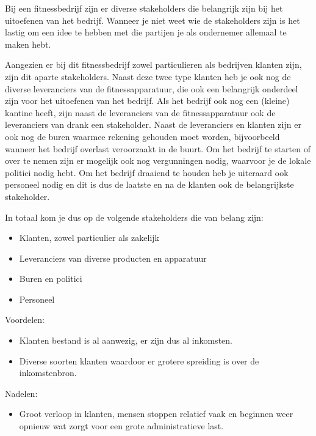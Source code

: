 Bij een fitnessbedrijf zijn er diverse stakeholders die belangrijk zijn bij het uitoefenen van het bedrijf. Wanneer je niet weet wie de stakeholders zijn is het lastig om een idee te hebben met die partijen je als ondernemer allemaal te maken hebt. 

Aangezien er bij dit fitnessbedrijf zowel particulieren als bedrijven klanten zijn, zijn dit aparte stakeholders. Naast deze twee type klanten heb je ook nog de diverse leveranciers van de fitnessapparatuur, die ook een belangrijk onderdeel zijn voor het uitoefenen van het bedrijf. Als het bedrijf ook nog een (kleine) kantine heeft, zijn naast de leveranciers van de fitnessapparatuur ook de leveranciers van drank een stakeholder.
Naast de leveranciers en klanten zijn er ook nog de buren waarmee rekening gehouden moet worden, bijvoorbeeld wanneer het bedrijf overlast veroorzaakt in de buurt. Om het bedrijf te starten of over te nemen zijn er mogelijk ook nog vergunningen nodig, waarvoor je de lokale politici nodig hebt.
Om het bedrijf draaiend te houden heb je uiteraard ook personeel nodig en dit is dus de laatste en na de klanten ook de belangrijkste stakeholder.

In totaal kom je dus op de volgende stakeholders die van belang zijn:
\begin{itemize}
        \item Klanten, zowel particulier als zakelijk
        \item Leveranciers van diverse producten en apparatuur
        \item Buren en politici
        \item Personeel
\end{itemize}


Voordelen: 
\begin{itemize}
        \item Klanten bestand is al aanwezig, er zijn dus al inkomsten.
        \item Diverse soorten klanten waardoor er grotere spreiding is over de inkomstenbron.
\end{itemize}

Nadelen:
\begin{itemize}
        \item Groot verloop in klanten, mensen stoppen relatief vaak en beginnen weer opnieuw wat zorgt voor een grote administratieve last.
\end{itemize}

